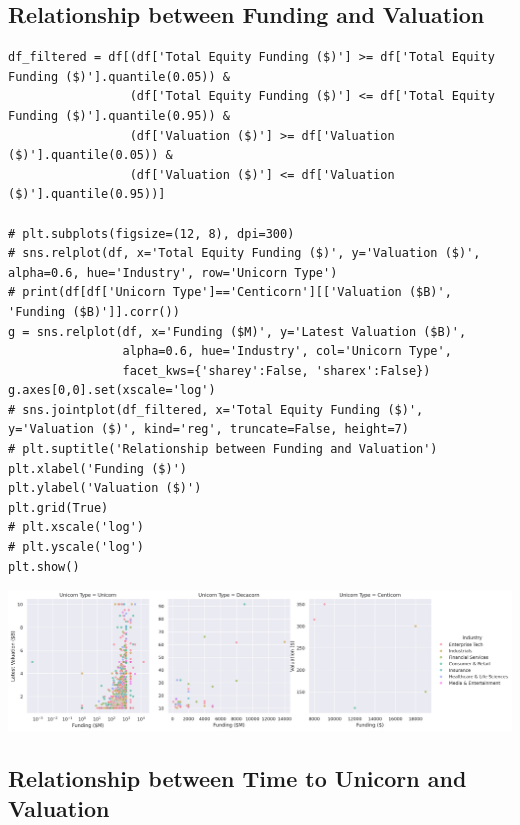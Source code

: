 \documentclass[a4paper,12pt]{article}
\begin{document}
\subsection{Relationship between Funding and Valuation}
\label{sec:org991f4f5}

\begin{verbatim}
df_filtered = df[(df['Total Equity Funding ($)'] >= df['Total Equity Funding ($)'].quantile(0.05)) &
                 (df['Total Equity Funding ($)'] <= df['Total Equity Funding ($)'].quantile(0.95)) &
                 (df['Valuation ($)'] >= df['Valuation ($)'].quantile(0.05)) &
                 (df['Valuation ($)'] <= df['Valuation ($)'].quantile(0.95))]

# plt.subplots(figsize=(12, 8), dpi=300)
# sns.relplot(df, x='Total Equity Funding ($)', y='Valuation ($)', alpha=0.6, hue='Industry', row='Unicorn Type')
# print(df[df['Unicorn Type']=='Centicorn'][['Valuation ($B)', 'Funding ($B)']].corr())
g = sns.relplot(df, x='Funding ($M)', y='Latest Valuation ($B)',
                alpha=0.6, hue='Industry', col='Unicorn Type',
                facet_kws={'sharey':False, 'sharex':False})
g.axes[0,0].set(xscale='log')
# sns.jointplot(df_filtered, x='Total Equity Funding ($)', y='Valuation ($)', kind='reg', truncate=False, height=7)
# plt.suptitle('Relationship between Funding and Valuation')
plt.xlabel('Funding ($)')
plt.ylabel('Valuation ($)')
plt.grid(True)
# plt.xscale('log')
# plt.yscale('log')
plt.show()
\end{verbatim}

\begin{center}
\includegraphics[width=.9\linewidth]{./.ob-jupyter/192589265a76e100ac55302b2ccbbe97c9b59c3c.png}
\label{}
\end{center}
\subsection{Relationship between Time to Unicorn and Valuation}
\label{sec:orgcc3437d}
\end{document}
